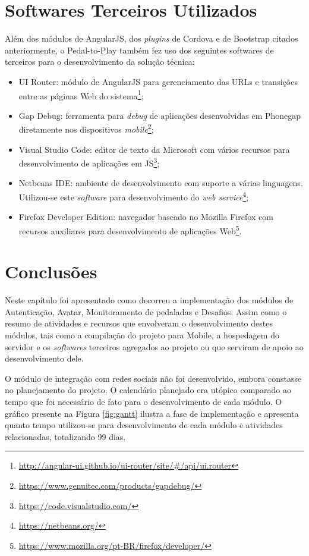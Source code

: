 \section{Softwares Terceiros Utilizados}
Além dos módulos de AngularJS, dos \textit{plugins} de Cordova e de Bootstrap citados anteriormente, o Pedal-to-Play também fez uso dos seguintes softwares de terceiros para o desenvolvimento da solução técnica:

\begin{itemize}
\item UI Router: módulo de AngularJS para gerenciamento das URLs e transições entre as páginas Web do sistema\footnote{\url{http://angular-ui.github.io/ui-router/site/\#/api/ui.router}}; 
\item Gap Debug: ferramenta para \textit{debug} de aplicações desenvolvidas em Phonegap diretamente nos dispositivos \textit{mobile}\footnote{\url{https://www.genuitec.com/products/gapdebug/}};
\item Visual Studio Code: editor de texto da Microsoft com vários recursos para desenvolvimento de aplicações em JS\footnote{\url{https://code.visualstudio.com/}};
\item Netbeans IDE: ambiente de desenvolvimento com suporte a várias linguagens. Utilizou-se este \textit{software} para desenvolvimento do \textit{web service}\footnote{\url{https://netbeans.org/}};
\item Firefox Developer Edition: navegador baseado no Mozilla Firefox com recursos auxiliares para desenvolvimento de aplicações Web\footnote{\url{https://www.mozilla.org/pt-BR/firefox/developer/}}.
\end{itemize}

\section{Conclusões}
Neste capítulo foi apresentado como decorreu a implementação dos módulos de Autenticação, Avatar, Monitoramento de pedaladas e Desafios. Assim como o resumo de atividades e recursos que envolveram o desenvolvimento destes módulos, tais como a compilação do projeto para Mobile, a hospedagem do servidor e os \textit{softwares} terceiros agregados ao projeto ou que serviram de apoio ao desenvolvimento dele.
\par
O módulo de integração com redes sociais não foi desenvolvido, embora constasse no planejamento do projeto. O calendário planejado era utópico comparado ao tempo que foi necessário de fato para o desenvolvimento de cada módulo. O gráfico presente na Figura \ref{fig:gantt} ilustra a fase de implementação e apresenta quanto tempo utilizou-se para desenvolvimento de cada módulo e atividades relacionadas, totalizando 99 dias.

